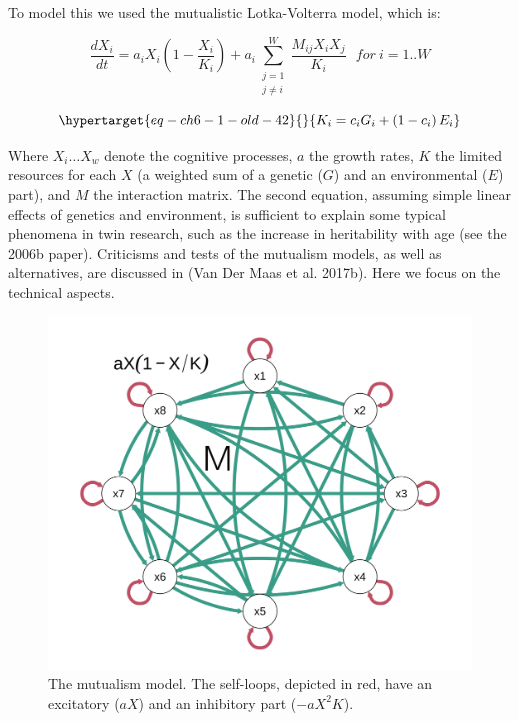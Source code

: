 \documentclass[
  a4paper,
  DIV=11,
  numbers=noendperiod,
  oneside]{scrreprt}
\begin{document}
To model this we used the mutualistic Lotka-Volterra model, which is:

\[\frac{dX_{i}}{dt} = a_{i}X_{i}\left( 1 - \frac{X_{i}}{K_{i}} \right) + a_{i}\sum_{\begin{array}{r}
j = 1 \\
j \neq i
\end{array}}^{W}\frac{M_{ij}X_{i}X_{j}}{K_{i}}\ \ \ for\ i = 1..W\]

\begin{equation}\protect\hypertarget{eq-ch6-1-old-42}{}{
K_{i} = c_{i}G_{i} + \left( 1 - c_{i} \right)E_{i}
}\label{eq-ch6-1-old-42}\end{equation}

Where \(X_{i} \ldots X_{w}\) denote the cognitive processes, \(a\) the
growth rates, \(K\) the limited resources for each \(X\) (a weighted sum
of a genetic (\(G\)) and an environmental (\(E\)) part), and \(M\) the
interaction matrix. The second equation, assuming simple linear effects
of genetics and environment, is sufficient to explain some typical
phenomena in twin research, such as the increase in heritability with
age (see the 2006b paper). Criticisms and tests of the mutualism models,
as well as alternatives, are discussed in (Van Der Maas et al. 2017b).
Here we focus on the technical aspects.

\begin{figure}

{\centering \includegraphics{media/ch6/fig-ch6-img6-old-75.png}

}

\caption{\label{fig-ch6-img6-old-75}The mutualism model. The self-loops,
depicted in red, have an excitatory (\(aX\)) and an inhibitory part
(\(- aX^{2}K\)).}

\end{figure}
\end{document}
